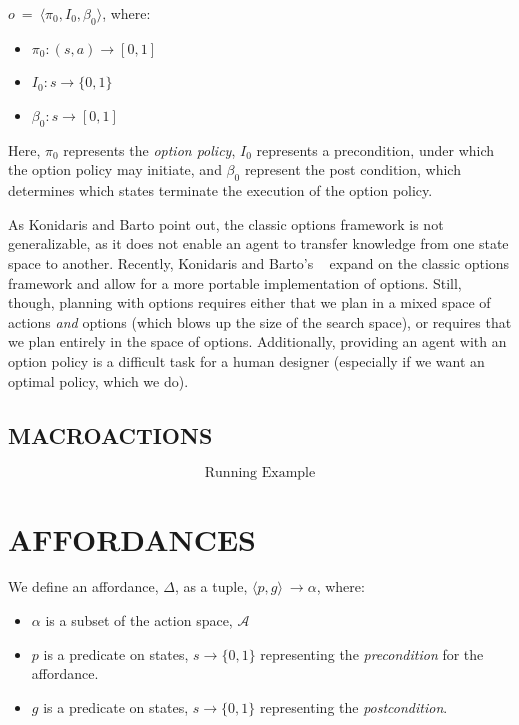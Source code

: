 \documentclass[]{article}
\begin{document}
$o\ =\ \langle \pi_0, I_0, \beta_0\rangle$, where:

\begin{itemize}
\item[] $\pi_0 : (s,a) \rightarrow [0,1]$
\item[] $I_0 : s \rightarrow \{0,1\}$
\item[] $\beta_0 : s \rightarrow [0,1]$
\end{itemize}

Here, $\pi_0$ represents the {\it option policy}, $I_0$ represents
a precondition, under which the option policy may initiate, and 
$\beta_0$ represent the post condition, which determines which 
states terminate the execution of the option policy.

As Konidaris and Barto point out, the classic options framework is not 
generalizable, as it does not enable an agent to transfer knowledge from 
one state space to another. Recently, Konidaris and Barto's ~\citep{konidaris07} 
expand on the classic options framework and allow for a more portable 
implementation of options. Still, though, planning with options requires either 
that we plan in a mixed space of actions {\it and} options (which blows up the 
size of the search space), or requires that we plan entirely in the space of options. 
Additionally, providing an agent with an option policy is a difficult task for a human 
designer (especially if we want an optimal policy, which we do).

\subsection{MACROACTIONS}

\[
\boxed{\text{Running Example}}
\]

\section{AFFORDANCES}

We define an affordance, $\Delta$, as a tuple, $\langle
p,g\rangle\ \longrightarrow \alpha$, where:
\begin{itemize}
\item[] $\alpha$ is a subset of the action space, $\mathcal{A}$
\item[] $p$ is a predicate on states, $s \longrightarrow \{$0$, 1\}$
  representing the {\em precondition} for the affordance.
\item[] $g$ is a predicate on states, $s \longrightarrow \{$0$,1\}$
  representing the {\em postcondition}.
\end{itemize}
\end{document}

